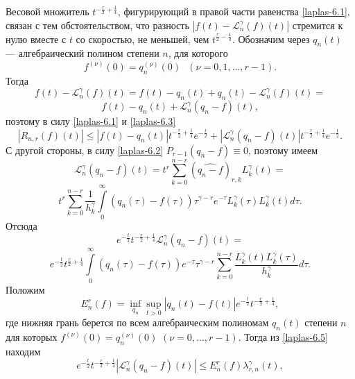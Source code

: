 Весовой множитель $t^{-\frac r2+\frac14}$, фигурирующий в правой части равенства \eqref{laplas-6.1}, связан с тем обстоятельством, что разность
$|f(t)-\mathcal{L}_n^\gamma(f)(t)|$ стремится к нулю вместе с $t$ со скоростью, не меньшей, чем  $t^{\frac r2-\frac14}$.
Обозначим через $q_n(t)$ --- алгебраический полином степени $n$, для которого
\begin{equation}\label{laplas-6.2}
  f^{(\nu)}(0)=q_n^{(\nu)}(0)\text{ }(\nu=0,1,\ldots,r-1).
\end{equation}
Тогда
\begin{equation*}
  f(t)-\mathcal{L}_n^\gamma(f)(t)=f(t)-q_n(t)+q_n(t)-\mathcal{L}_n^\gamma(f)(t)=
\end{equation*}
\begin{equation}\label{laplas-6.3}
  f(t)-q_n(t)+\mathcal{L}_n^\gamma(q_n-f)(t),
\end{equation}
поэтому в силу \eqref{laplas-6.1} и \eqref{laplas-6.3}
\begin{equation}\label{laplas-6.4}
  |R_{n,r}(f)(t)|\le|f(t)-q_n(t)|t^{-\frac r2+\frac14}e^{-\frac t2}+|\mathcal{L}_n^\gamma(q_n-f)(t)|t^{-\frac r2+\frac14}e^{-\frac t2}.
\end{equation}
С другой стороны, в силу \eqref{laplas-6.2} $P_{r-1}(q_n-f)\equiv0$, поэтому  имеем
\begin{equation*}
  \mathcal{L}_n^\gamma(q_n-f)(t)=t^r\sum\limits_{k=0}^{n-r}(\widehat{q_n-f})_{r,k}L_k^\gamma(t)=
\end{equation*}
\begin{equation*}
  t^r\sum\limits_{k=0}^{n-r}\frac1{h_k^\gamma}\int\limits_0^\infty(q_n(\tau)-f(\tau))\tau^{\gamma-r}e^{-\tau}L_k^\gamma(\tau)L_k^\gamma(t)d\tau.
\end{equation*}
Отсюда
$$
e^{-\frac t2}t^{-\frac r2+\frac14}\mathcal{L}_n^\gamma(q_n-f)(t)=
$$
\begin{equation}\label{laplas-6.5}
  e^{-\frac t2}t^{\frac r2+\frac14}\int\limits_0^\infty(q_n(\tau)-f(\tau))e^{-\tau}\tau^{\gamma-r}\sum\limits_{k=0}^{n-r}\frac{L_k^\gamma(t)L_k^\gamma(\tau)}{h_k^\gamma}d\tau.
\end{equation}
Положим
\begin{equation}\label{laplas-6.6}
  E_n^r(f)=\inf\limits_{q_n}\sup\limits_{t>0}|q_n(t)-f(t)|e^{-\frac t2}t^{-\frac r2+\frac14},
\end{equation}
где нижняя грань берется по всем алгебраическим полиномам $q_n(t)$ степени $n$ для которых $f^{(\nu)}(0)=q_n^{(\nu)}(0)$ $(\nu=0,\ldots,r-1)$. Тогда из \eqref{laplas-6.5} находим
\begin{equation}\label{laplas-6.7}
 e^{-\frac{t}{2}} t^{-\frac r2+\frac14}|\mathcal{L}_n^\gamma(q_n-f)(t)|\le E_n^r(f)\lambda_{r,n}^\gamma(t),
\end{equation}
